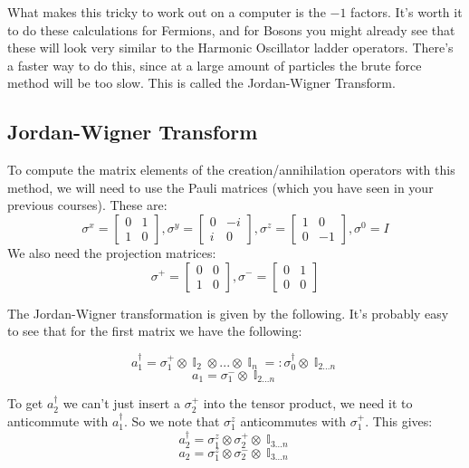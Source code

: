 \documentclass{article}
\DeclareMathOperator{\II}{\mathbb{I}}
\begin{document}
What makes this tricky to work out on a computer is the $-1$ factors. It's worth it to do these calculations for Fermions, and for Bosons you might already see that these will look very similar to the Harmonic Oscillator ladder operators. There's a faster way to do this, since at a large amount of particles the brute force method will be too slow. This is called the Jordan-Wigner Transform.
\subsection{Jordan-Wigner Transform}
To compute the matrix elements of the creation/annihilation operators with this method, we will need to use the Pauli matrices (which you have seen in your previous courses). These are:
\begin{equation}
\sigma^x = \begin{bmatrix}0&1\\1&0\end{bmatrix}, \sigma^y = \begin{bmatrix}0&-i\\i&0\end{bmatrix}, \sigma^z = \begin{bmatrix}1&0\\0&-1\end{bmatrix}, \sigma^0 = I
\end{equation}
We also need the projection matrices:
\begin{equation}
\sigma^+ = \begin{bmatrix}0&0\\1&0\end{bmatrix}, \sigma^- = \begin{bmatrix}0&1\\0&0\end{bmatrix}
\end{equation}

The Jordan-Wigner transformation is given by the following. It's probably easy to see that for the first matrix we have the following:

\[a_1^\dagger = \sigma_1^+\otimes \II_2\otimes...\otimes\II_n =: \sigma_0^\dagger \otimes \II_{2...n}\]
\[a_1 = \sigma_1^- \otimes \II_{2...n}\]

To get $a_2^\dagger$ we can't just insert a $\sigma_2^+$ into the tensor product, we need it to anticommute with $a_1^\dagger$. So we note that $\sigma_1^z$ anticommutes with $\sigma_1^+$. This gives:
\[a_2^\dagger = \sigma_1^z \otimes \sigma_2^+\otimes \II_{3...n}\]
\[a_2 = \sigma_1^z\otimes \sigma_2^- \otimes \II_{3...n}\]
\end{document}
